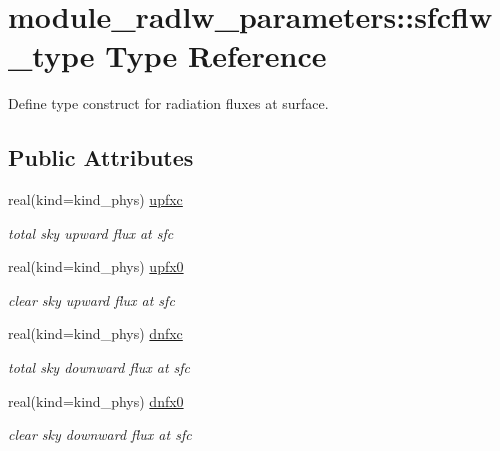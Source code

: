 \hypertarget{structmodule__radlw__parameters_1_1sfcflw__type}{}\section{module\+\_\+radlw\+\_\+parameters\+:\+:sfcflw\+\_\+type Type Reference}
\label{structmodule__radlw__parameters_1_1sfcflw__type}


Define type construct for radiation fluxes at surface.  


\subsection*{Public Attributes}
\textbf{ }\par
\begin{DoxyCompactItemize}
\item 
\mbox{\label{structmodule__radlw__parameters_1_1sfcflw__type_ab281301c9fad950c86a379cdec0963aa}} 
real(kind=kind\+\_\+phys) \hyperlink{structmodule__radlw__parameters_1_1sfcflw__type_ab281301c9fad950c86a379cdec0963aa}{upfxc}
\begin{DoxyCompactList}\small\item\em total sky upward flux at sfc \end{DoxyCompactList}\item 
\mbox{\label{structmodule__radlw__parameters_1_1sfcflw__type_ab186f43f5f87043de996c1fa6f59dc6e}} 
real(kind=kind\+\_\+phys) \hyperlink{structmodule__radlw__parameters_1_1sfcflw__type_ab186f43f5f87043de996c1fa6f59dc6e}{upfx0}
\begin{DoxyCompactList}\small\item\em clear sky upward flux at sfc \end{DoxyCompactList}\item 
\mbox{\label{structmodule__radlw__parameters_1_1sfcflw__type_ae65c0014042ceffec4293e4d300f9cb8}} 
real(kind=kind\+\_\+phys) \hyperlink{structmodule__radlw__parameters_1_1sfcflw__type_ae65c0014042ceffec4293e4d300f9cb8}{dnfxc}
\begin{DoxyCompactList}\small\item\em total sky downward flux at sfc \end{DoxyCompactList}\item 
\mbox{\label{structmodule__radlw__parameters_1_1sfcflw__type_adac8d084ff59310f6c6f4fdff1a0e5e6}} 
real(kind=kind\+\_\+phys) \hyperlink{structmodule__radlw__parameters_1_1sfcflw__type_adac8d084ff59310f6c6f4fdff1a0e5e6}{dnfx0}
\begin{DoxyCompactList}\small\item\em clear sky downward flux at sfc \end{DoxyCompactList}\end{DoxyCompactItemize}



